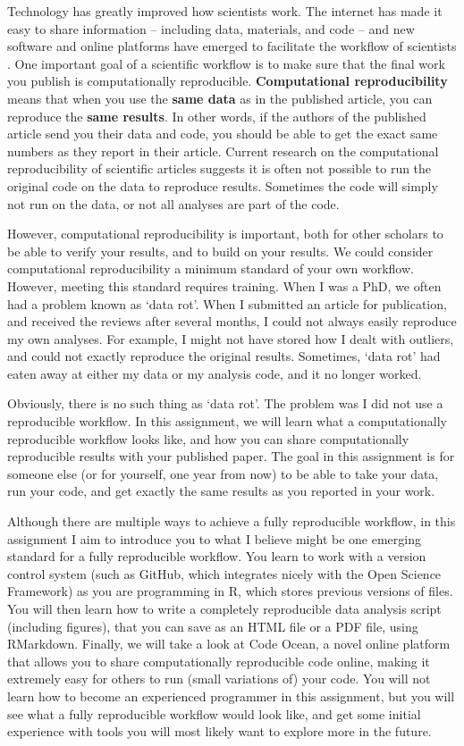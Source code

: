 \documentclass[
  oneside]{book}
\begin{document}
Technology has greatly improved how scientists work. The internet has made it
easy to share information -- including data, materials, and code -- and new
software and online platforms have emerged to facilitate the workflow of
scientists \citep{spellman_short_2015}. One important goal of a scientific workflow is to make sure that the
final work you publish is computationally reproducible. \textbf{Computational
reproducibility} means that when you use the \textbf{same data} as in the published
article, you can reproduce the \textbf{same results}. In other words, if the authors
of the published article send you their data and code, you should be able to get
the exact same numbers as they report in their article. Current research on the
computational reproducibility of scientific articles suggests it is often not
possible to run the original code on the data to reproduce results. Sometimes
the code will simply not run on the data, or not all analyses are part of the
code.

However, computational reproducibility is important, both for other scholars to
be able to verify your results, and to build on your results. We could consider
computational reproducibility a minimum standard of your own workflow. However,
meeting this standard requires training. When I was a PhD, we often had a
problem known as `data rot'. When I submitted an article for publication, and
received the reviews after several months, I could not always easily reproduce
my own analyses. For example, I might not have stored how I dealt with outliers,
and could not exactly reproduce the original results. Sometimes, `data rot' had
eaten away at either my data or my analysis code, and it no longer worked.

Obviously, there is no such thing as `data rot'. The problem was I did not use a
reproducible workflow. In this assignment, we will learn what a computationally
reproducible workflow looks like, and how you can share computationally
reproducible results with your published paper. The goal in this assignment is
for someone else (or for yourself, one year from now) to be able to take your
data, run your code, and get exactly the same results as you reported in your
work.

Although there are multiple ways to achieve a fully reproducible workflow, in
this assignment I aim to introduce you to what I believe might be one emerging
standard for a fully reproducible workflow. You learn to work with a version
control system (such as GitHub, which integrates nicely with the Open Science
Framework) as you are programming in R, which stores previous versions of files.
You will then learn how to write a completely reproducible data analysis script
(including figures), that you can save as an HTML file or a PDF file, using
RMarkdown. Finally, we will take a look at Code Ocean, a novel online platform
that allows you to share computationally reproducible code online, making it
extremely easy for others to run (small variations of) your code. You will not
learn how to become an experienced programmer in this assignment, but you will
see what a fully reproducible workflow would look like, and get some initial
experience with tools you will most likely want to explore more in the future.
\end{document}
